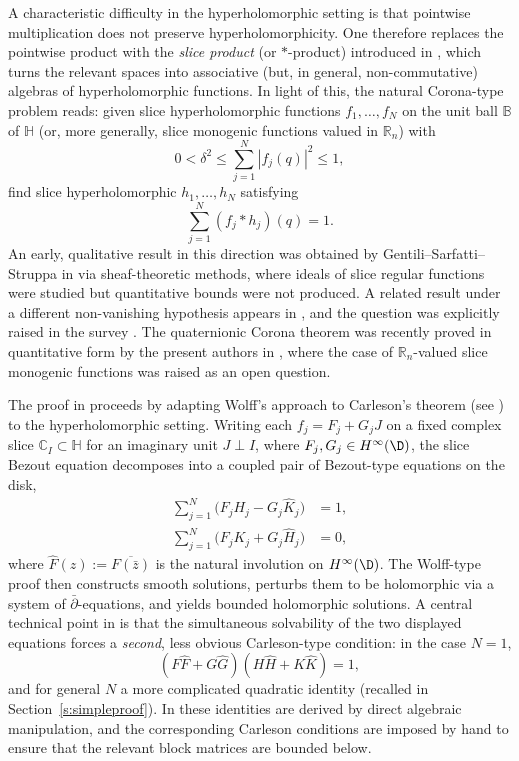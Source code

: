 \documentclass[11pt]{amsart}
\begin{document}
A characteristic difficulty in the hyperholomorphic setting is that pointwise multiplication does not preserve hyperholomorphicity.  One therefore replaces the pointwise product with the \emph{slice product} (or $\ast$-product) introduced in \cites{MR2684426,MR2520116}, which turns the relevant spaces into associative (but, in general, non-commutative) algebras of hyperholomorphic functions.  In light of this, the natural Corona-type problem reads: given slice hyperholomorphic functions $f_1,\ldots,f_N$ on the unit ball $\mathbb B$ of $\mathbb H$ (or, more generally, slice monogenic functions valued in $\mathbb{R}_n$) with
\[
0<\delta^2\le \sum_{j=1}^N |f_j(q)|^2\le 1,
\]
find slice hyperholomorphic $h_1,\ldots,h_N$ satisfying
\[
\sum_{j=1}^N (f_j\ast h_j)(q)=1.
\]
An early, qualitative result in this direction was obtained by Gentili--Sarfatti--Struppa in \cite{MR3621101} via sheaf-theoretic methods, where ideals of slice regular functions were studied but quantitative bounds were not produced.  A related result under a different non-vanishing hypothesis appears in \cite{Shelah_MSThesis}, and the question was explicitly raised in the survey \cite{Saracco}.  The quaternionic Corona theorem was recently proved in quantitative form by the present authors in \cite{CPSW}, where the case of $\mathbb{R}_n$-valued slice monogenic functions was raised as an open question.

The proof in \cite{CPSW} proceeds by adapting Wolff's approach to Carleson's theorem (see \cites{MR2261424,MR1419088,MR1669574,MR0827223}) to the hyperholomorphic setting.  Writing each $f_j=F_j+G_jJ$ on a fixed complex slice $\mathbb{C}_I\subset \mathbb H$ for an imaginary unit $J\perp I$, where $F_j,G_j\in H^\infty(\D)$, the slice Bezout equation decomposes into a coupled pair of Bezout-type equations on the disk,
\begin{align*}
\sum_{j=1}^{N}\bigl(F_jH_j-G_j\hat K_j\bigr)&=1,\\
\sum_{j=1}^{N}\bigl(F_jK_j+G_j\hat H_j\bigr)&=0,
\end{align*}
where $\hat F(z):=\overline{F(\bar z)}$ is the natural involution on $H^\infty(\D)$.  The Wolff-type proof then constructs smooth solutions, perturbs them to be holomorphic via a system of $\bar\partial$-equations, and yields bounded holomorphic solutions.  A central technical point in \cite{CPSW} is that the simultaneous solvability of the two displayed equations forces a \emph{second}, less obvious Carleson-type condition: in the case $N=1$,
\begin{equation}\label{eq:intro-aux}
(F\hat F+G\hat G)(H\hat H+K\hat K)=1,
\end{equation}
and for general $N$ a more complicated quadratic identity (recalled in Section~\ref{s:simpleproof}).  In \cite{CPSW} these identities are derived by direct algebraic manipulation, and the corresponding Carleson conditions are imposed by hand to ensure that the relevant block matrices are bounded below.
\end{document}
